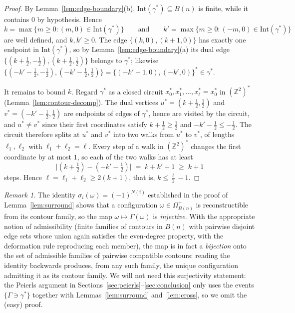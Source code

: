 \documentclass[11pt]{article}
\theoremstyle{plain}
\theoremstyle{definition}
\theoremstyle{remark}
\newtheorem{remark}[theorem]{Remark}
\newcommand{\Z}{\mathbb{Z}}
\newcommand{\sg}{\sigma}
\newcommand{\dualZ}{(\Z^2)^*}       %
\newcommand{\Intr}{\mathrm{Int}}    %
\newcommand{\Gam}{\Gamma}           %
\begin{document}
\begin{proof}
By Lemma~\ref{lem:edge-boundary}(b), $\Intr(\gamma^*)\subseteq B(n)$ is
finite, while it contains $0$ by hypothesis. Hence
\[
  k=\max\{m\ge0 : (m,0)\in\Intr(\gamma^*)\}
  \qquad\text{and}\qquad
  k'=\max\{m\ge0 : (-m,0)\in\Intr(\gamma^*)\}
\]
are well defined, and $k,k'\ge0$. The edge $\{(k,0),(k+1,0)\}$ has exactly
one endpoint in $\Intr(\gamma^*)$, so by Lemma~\ref{lem:edge-boundary}(a)
its dual edge $\{(k+\tfrac12,-\tfrac12),(k+\tfrac12,\tfrac12)\}$ belongs to
$\gamma^*$; likewise
$\{(-k'-\tfrac12,-\tfrac12),(-k'-\tfrac12,\tfrac12)\}
=\{(-k'-1,0),(-k',0)\}^*\in\gamma^*$.

It remains to bound $k$. Regard $\gamma^*$ as a closed circuit
$x_0^*,x_1^*,\dots,x_\ell^*=x_0^*$ in $\dualZ$
(Lemma~\ref{lem:contour-decomp}). The dual vertices
$u^*=(k+\tfrac12,\tfrac12)$ and $v^*=(-k'-\tfrac12,\tfrac12)$ are endpoints
of edges of $\gamma^*$, hence are visited by the circuit, and $u^*\neq v^*$
since their first coordinates satisfy $k+\tfrac12\ge\tfrac12$ and
$-k'-\tfrac12\le-\tfrac12$. The circuit therefore splits at $u^*$ and $v^*$
into two walks from $u^*$ to $v^*$, of lengths $\ell_1,\ell_2$ with
$\ell_1+\ell_2=\ell$. Every step of a walk in $\dualZ$ changes the first
coordinate by at most $1$, so each of the two walks has at least
\[
  \big|(k+\tfrac12)-(-k'-\tfrac12)\big| \;=\; k+k'+1 \;\ge\; k+1
\]
steps. Hence $\ell=\ell_1+\ell_2\ge 2(k+1)$, that is,
$k\le\tfrac{\ell}{2}-1$.
\end{proof}

\begin{remark}\label{rem:bijection}
The identity $\sg_i(\omega)=(-1)^{N(i)}$ established in the proof of
Lemma~\ref{lem:surround} shows that a configuration
$\omega\in\Omega^{+}_{B(n)}$ is reconstructible from its contour family, so
the map $\omega\mapsto\Gam(\omega)$ is \emph{injective}. With the
appropriate notion of admissibility (finite families of contours in $B(n)$
with pairwise disjoint edge sets whose union again satisfies the
even-degree property, with the deformation rule reproducing each member),
the map is in fact a \emph{bijection} onto the set of admissible families of
pairwise compatible contours: reading the identity backwards produces, from
any such family, the unique configuration admitting it as its contour
family. We will not need this surjectivity statement: the Peierls argument
in Sections~\ref{sec:peierls}--\ref{sec:conclusion} only uses the events
$\{\Gam\ni\gamma^*\}$ together with Lemmas~\ref{lem:surround}
and~\ref{lem:cross}, so we omit the (easy) proof.
\end{remark}
\end{document}
